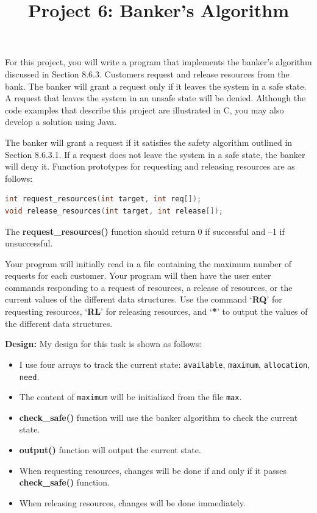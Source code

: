 \documentclass[UTF8,10pt,a4paper]{article}
\title{Project 6: Banker's Algorithm}
\date{}
\theoremstyle{Problem}
\theoremstyle{Solution}
\begin{document}
\maketitle
\thispagestyle{FirstPageStyle}

For this project, you will write a program that implements the banker’s algorithm discussed in Section 8.6.3. Customers request and release resources from the bank. The banker will grant a request only if it leaves the system in a safe state. A request that leaves the system in an unsafe state will be denied. Although the code examples that describe this project are illustrated in C, you may also develop a solution using Java.

The banker will grant a request if it satisfies the safety algorithm outlined in Section 8.6.3.1. If a request does not leave the system in a safe state, the banker will deny it. Function prototypes for requesting and releasing resources are as follows:

\begin{lstlisting}[language = c]
int request_resources(int target, int req[]);
void release_resources(int target, int release[]);
\end{lstlisting}

The \textbf{request\_resources()} function should return 0 if successful and –1 if
unsuccessful.

Your program will initially read in a file containing the maximum number of requests for each customer. Your program will then have the user enter commands responding to a request of resources, a release of resources, or the current values of the different data structures. Use the command ‘\textbf{RQ}’ for requesting resources, ‘\textbf{RL}’ for releasing resources, and ‘\textbf{*}’ to output the values of the different data structures.

\textbf{Design:} My design for this task is shown as follows:

\begin{itemize}
    \item I use four arrays to track the current state: \texttt{available}, \texttt{maximum}, \texttt{allocation}, \texttt{need}. 
    
    \item The content of \texttt{maximum} will be initialized from the file \texttt{max}.
    
    \item \textbf{check\_safe()} function will use the banker algorithm to check the current state.
    
    \item \textbf{output()} function will output the current state.
    
    \item When requesting resources, changes will be done if and only if it passes \textbf{check\_safe()} function.
    
    \item When releasing resources, changes will be done immediately.
\end{itemize}
\end{document}
